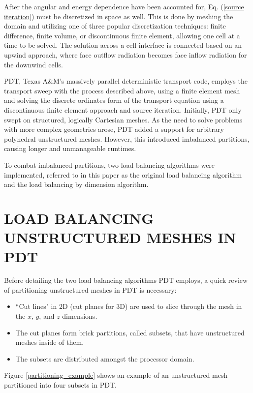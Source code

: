 \documentclass[letterpaper]{mandc2019}
\begin{document}
After the angular and energy dependence have been accounted for, Eq. (\ref{source iteration}) must be discretized in space as well. This is done by meshing the domain and utilizing one of three popular discretization techniques: finite difference\cite{fd}, finite volume\cite{fd}, or discontinuous finite element\cite{Reed}, allowing one cell at a time to be solved. The solution across a cell interface is connected based on an upwind approach, where face outflow radiation becomes face inflow radiation for the downwind cells. 

PDT, Texas A\&M's massively parallel deterministic transport code, employs the transport sweep with the process described above, using a finite element mesh and solving the discrete ordinates form of the transport equation using a discontinuous finite element approach and source iteration\cite{mpadams15, mpadams13}. Initially, PDT only swept on structured, logically Cartesian meshes. As the need to solve problems with more complex geometries arose, PDT added a support for arbitrary polyhedral unstructured meshes. However, this introduced imbalanced partitions, causing longer and unmanageable runtimes.

To combat imbalanced partitions, two load balancing algorithms were implemented, referred to in this paper as the original load balancing algorithm and the load balancing by dimension algorithm.

\section{LOAD BALANCING UNSTRUCTURED MESHES IN PDT} 
\label{sec:first}

Before detailing the two load balancing algorithms PDT employs, a quick review of partitioning unstructured meshes in PDT is necessary:
\begin{itemize}\itemsep 1pt \parskip 0pt \parsep 0pt
\item ``Cut lines" in 2D (cut planes for 3D) are used to slice through the mesh in the $x$, $y$, and $z$ dimensions.
\item The cut planes form brick partitions, called subsets, that have unstructured meshes inside of them. 
\item The subsets are distributed amongst the processor domain.
\end{itemize}
Figure \ref{partitioning_example} shows an example of an unstructured mesh partitioned into four subsets in PDT. 
\end{document}
